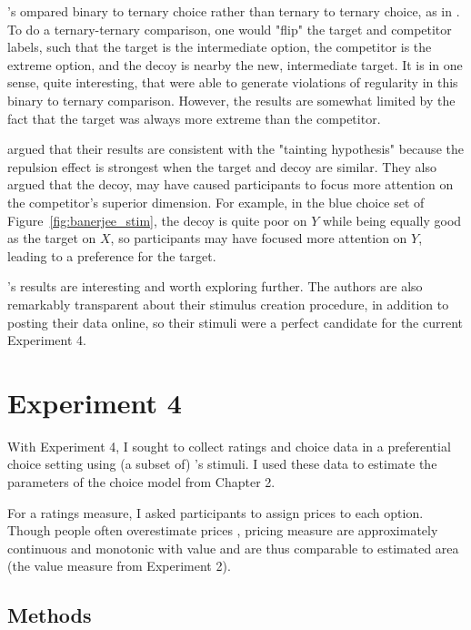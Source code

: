 \textcite{banerjeeFactorsThatPromote2024}'s ompared binary to ternary choice rather than ternary to ternary choice, as in \textcite{spektorWhenGoodLooks2018b}. To do a ternary-ternary comparison, one would "flip" the target and competitor labels, such that the target is the intermediate option, the competitor is the extreme option, and the decoy is nearby the new, intermediate target. It is in one sense, quite interesting, that \textcite{banerjeeFactorsThatPromote2024} were able to generate violations of regularity in this binary to ternary comparison. However, the results are somewhat limited by the fact that the target was always more extreme than the competitor.

\textcite{banerjeeFactorsThatPromote2024} argued that their results are consistent with the "tainting hypothesis" \parencite{simonson2014vices} because the repulsion effect is strongest when the target and decoy are similar. They also argued that the decoy, may have caused participants to focus more attention on the competitor's superior dimension. For example, in the blue choice set of Figure~\ref{fig:banerjee_stim}, the decoy is quite poor on $Y$ while being equally good as the target on $X$, so participants may have focused more attention on $Y$, leading to a preference for the target. 

\textcite{banerjeeFactorsThatPromote2024}'s results are interesting and worth exploring further. The authors are also remarkably transparent about their stimulus creation procedure, in addition to posting their data online, so their stimuli were a perfect candidate for the current Experiment 4.

\section{Experiment 4}

With Experiment 4, I sought to collect ratings and choice data in a preferential choice setting using (a subset of) \textcite{banerjeeFactorsThatPromote2024}'s stimuli. I used these data to estimate the parameters of the choice model from Chapter 2. 

For a ratings measure, I asked participants to assign prices to each option. Though people often overestimate prices \parencite{breidertREVIEWMETHODSMEASURING2006}, pricing measure are approximately continuous and monotonic with value and are thus comparable to estimated area (the value measure from Experiment 2).

\subsection{Methods}

